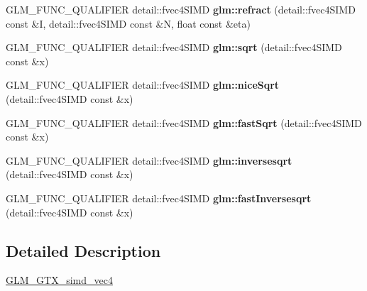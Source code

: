 \begin{DoxyCompactItemize}
G\+L\+M\+\_\+\+F\+U\+N\+C\+\_\+\+Q\+U\+A\+L\+I\+F\+I\+ER detail\+::fvec4\+S\+I\+MD {\bfseries glm\+::refract} (detail\+::fvec4\+S\+I\+MD const \&I, detail\+::fvec4\+S\+I\+MD const \&N, float const \&eta)
\item 
\mbox{\label{simd__vec4_8inl_a0af4fc25d7a64d4947598f48a0229375}} 
G\+L\+M\+\_\+\+F\+U\+N\+C\+\_\+\+Q\+U\+A\+L\+I\+F\+I\+ER detail\+::fvec4\+S\+I\+MD {\bfseries glm\+::sqrt} (detail\+::fvec4\+S\+I\+MD const \&x)
\item 
\mbox{\label{simd__vec4_8inl_a4b8b68e979fc5b12aba9290beb8dfb30}} 
G\+L\+M\+\_\+\+F\+U\+N\+C\+\_\+\+Q\+U\+A\+L\+I\+F\+I\+ER detail\+::fvec4\+S\+I\+MD {\bfseries glm\+::nice\+Sqrt} (detail\+::fvec4\+S\+I\+MD const \&x)
\item 
\mbox{\label{simd__vec4_8inl_a668307d251c9bc5a349ab3d2d83095d4}} 
G\+L\+M\+\_\+\+F\+U\+N\+C\+\_\+\+Q\+U\+A\+L\+I\+F\+I\+ER detail\+::fvec4\+S\+I\+MD {\bfseries glm\+::fast\+Sqrt} (detail\+::fvec4\+S\+I\+MD const \&x)
\item 
\mbox{\label{simd__vec4_8inl_ac3ad88ad132bb5179b928f3f57afc6b5}} 
G\+L\+M\+\_\+\+F\+U\+N\+C\+\_\+\+Q\+U\+A\+L\+I\+F\+I\+ER detail\+::fvec4\+S\+I\+MD {\bfseries glm\+::inversesqrt} (detail\+::fvec4\+S\+I\+MD const \&x)
\item 
\mbox{\label{simd__vec4_8inl_af499190525c6e1f524054b9b18b12444}} 
G\+L\+M\+\_\+\+F\+U\+N\+C\+\_\+\+Q\+U\+A\+L\+I\+F\+I\+ER detail\+::fvec4\+S\+I\+MD {\bfseries glm\+::fast\+Inversesqrt} (detail\+::fvec4\+S\+I\+MD const \&x)
\end{DoxyCompactItemize}


\subsection{Detailed Description}
\hyperlink{group__gtx__simd__vec4}{G\+L\+M\+\_\+\+G\+T\+X\+\_\+simd\+\_\+vec4} 